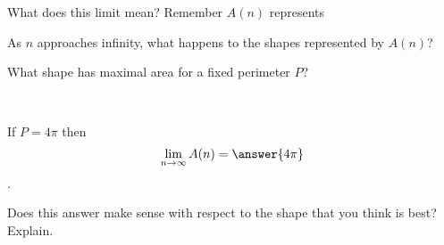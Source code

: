 \documentclass[handout,nooutcomes]{ximera}
\begin{document}
What does this limit mean? Remember $A(n)$ represents
\begin{multipleChoice}
\end{multipleChoice}
\begin{freeResponse}
As $n$ approaches infinity, what happens to the shapes represented by $A(n)$?
\end{freeResponse}

What shape has maximal area for a fixed perimeter $P$?
\begin{multipleChoice}
\end{multipleChoice}\\

\bigskip

If $P = 4\pi$ then \[\lim_{n \to \infty} A(n) = \answer{4\pi}\].\\
\begin{freeResponse}
Does this answer make sense with respect to the shape that you think is best? Explain.
\end{freeResponse}
\end{document}
